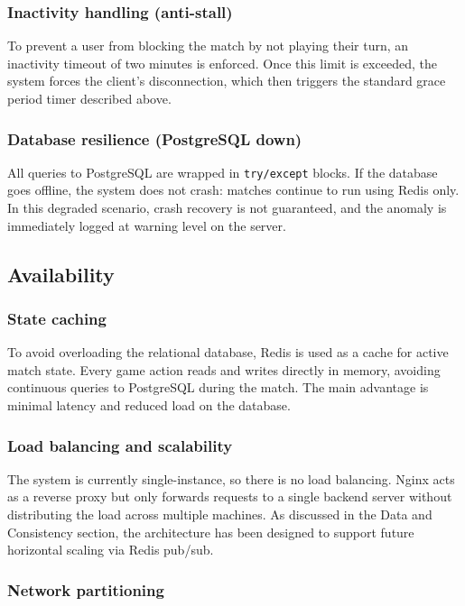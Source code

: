 \documentclass{scrartcl}
\begin{document}
\subsubsection*{Inactivity handling (anti-stall)}

To prevent a user from blocking the match by not playing their turn,
an inactivity timeout of two minutes is enforced.
Once this limit is exceeded, the system forces the client's disconnection,
which then triggers the standard grace period timer described above.

\subsubsection*{Database resilience (PostgreSQL down)}

All queries to PostgreSQL are wrapped in \texttt{try/except} blocks.
If the database goes offline, the system does not crash: matches continue
to run using Redis only.
In this degraded scenario, crash recovery is not guaranteed,
and the anomaly is immediately logged at warning level on the server.

\subsection{Availability}\label{availability}

\subsubsection*{State caching}

To avoid overloading the relational database, Redis is used as a cache
for active match state.
Every game action reads and writes directly in memory,
avoiding continuous queries to PostgreSQL during the match.
The main advantage is minimal latency and reduced load on the database.

\subsubsection*{Load balancing and scalability}

The system is currently single-instance, so there is no load balancing.
Nginx acts as a reverse proxy but only forwards requests to a single backend
server without distributing the load across multiple machines.
As discussed in the Data and Consistency section, the architecture has been
designed to support future horizontal scaling via Redis pub/sub.

\subsubsection*{Network partitioning}
\end{document}
